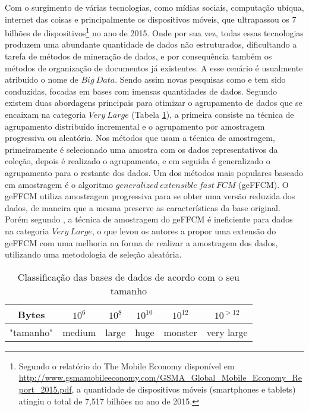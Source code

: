 Com o surgimento de várias tecnologias, como mídias sociais, computação ubíqua, internet das coisas 
e principalmente os dispositivos móveis, que ultrapassou os 7 bilhões de
dispositivos\footnote{Segundo o relatório do The Mobile Economy disponível em
\url{http://www.gsmamobileeconomy.com/GSMA_Global_Mobile_Economy_Report_2015.pdf}, a quantidade de
dispositivos móveis (smartphones e tablets) atingiu o total de 7,517 bilhões no ano de 2015.} no ano
de 2015. Onde por sua vez, todas essas tecnologias produzem uma abundante quantidade de dados não
estruturados, dificultando a tarefa de métodos de mineração de dados, e por consequência
também os métodos de organização de documentos já existentes. A esse cenário é usualmente atribuído
o nome de $Big\ Data$. Sendo assim novas pesquisas como \cite{Havens2012} e \cite{Kumar2015} tem 
sido conduzidas, focadas em bases com imensas quantidades de dados. Segundo \cite{Havens2012} 
existem duas abordagens principais para otimizar o agrupamento de dados que se encaixam na categoria
$Very\ Large$ (Tabela \ref{table:datasize}), a primeira consiste na técnica de agrupamento
distribuído incremental e o agrupamento por amostragem progressiva ou aleatória. Nos métodos que
usam a técnica de amostragem, primeiramente é selecionado uma amostra com os dados representativos 
da coleção, depois é realizado o agrupamento, e em seguida é generalizado o agrupamento para o
restante dos dados. Um dos métodos mais populares baseado em amostragem é o algoritmo 
$generalized\ extensible\ fast\ FCM$ (geFFCM)\cite{Havens2012}. O geFFCM utiliza amostragem
progressiva para se obter uma versão reduzida dos dados, de maneira que a mesma preserve as
características da base original. Porém segundo \cite{Havens2012}, a técnica de amostragem do geFFCM
é ineficiente para dados na categoria $Very\ Large$, o que levou os autores a propor uma extensão do
geFFCM com uma melhoria na forma de realizar a amostragem dos dados, utilizando uma metodologia de
seleção aleatória.

\begin{table}[!htp]
  \centering
  \begin{tabular}{ |c|c c c c c|}
    \hline
    Bytes & $10^6$ & $10^8$ & $10^{10}$ & $10^{12}$ & $10^{>12}$ \\
    \hline
    "tamanho" & medium & large & huge & monster & very large \\
    \hline
  \end{tabular}
  \caption{Classificação das bases de dados de acordo com o seu tamanho\cite{Havens2012}}
  \label{table:datasize}
\end{table}

